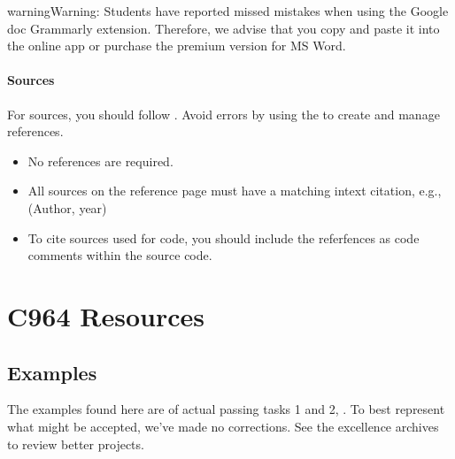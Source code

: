 \documentclass[letterpaper,10pt,english]{jupyterBook}
\begin{document}
\begin{sphinxadmonition}{warning}{Warning:}
\sphinxAtStartPar
Students have reported missed mistakes when using the Google doc Grammarly extension. Therefore, we advise that you copy and paste it into the online app or purchase the premium version for MS Word.
\end{sphinxadmonition}


\subsubsection{Sources}
\label{\detokenize{task2_doc/task2_doc_finish:sources}}\label{\detokenize{task2_doc/task2_doc_finish:task2-doc-finish-sources}}
\sphinxAtStartPar
For sources, you should follow . Avoid errors by using the  to create and manage references.
\begin{itemize}
\item {} 
\sphinxAtStartPar
No references are required.

\item {} 
\sphinxAtStartPar
All sources on the reference page must have a matching in\sphinxhyphen{}text citation, e.g., (Author, year)

\item {} 
\sphinxAtStartPar
To cite sources used for code, you should include the referfences as code comments within the source code.

\end{itemize}

\sphinxstepscope


\chapter{C964 Resources}
\label{\detokenize{resources:c964-resources}}\label{\detokenize{resources::doc}}





\section{Examples}
\label{\detokenize{resources:examples}}\label{\detokenize{resources:resources-examples}}
\sphinxAtStartPar
The examples found here are of actual passing tasks 1 and 2, . To best represent what might be accepted, we’ve made no corrections. See the excellence archives to review better projects.
\end{document}
